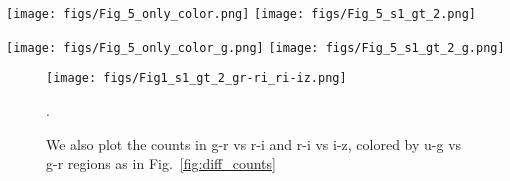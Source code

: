 \documentclass[fleqn,usenatbib]{mnras}  %
\begin{document}
\begin{figure*}
\texttt{[image: figs/Fig\_5\_only\_color.png]}
\texttt{[image: figs/Fig\_5\_s1\_gt\_2.png]}
\caption{Two four-panel figures side by side for the ease of comparison.  Both contain counts in the u vs u-g and  u-g vs g-r,  colored by regions marked on the panel, and differential counts in u and r (see Fig.1 of Ivezic+2004).  The counts contain only objects as selected by u-g vs g-r color cuts, to colors on the differential counts panels corresponds to the colors on u-g vs g-r space. Red objects are mostly quasars, blue: hot stars (one can easily pick out two white dwarf branches, see  Fig.23 and 24 in Ivezic+2007), green : transitional region, black : main sequence stars .  Left set of four panels   : only color-selected object . Right  set : variability and color-selected objects. Note that including $\chi^{2}_{DOF,R}(g) > 2$ cut we vastly reduce contamination due to main sequence stars, and hot white  dwarfs.  }
\label{fig:diff_counts}
\end{figure*}

\begin{figure*}
\texttt{[image: figs/Fig\_5\_only\_color\_g.png]}
\texttt{[image: figs/Fig\_5\_s1\_gt\_2\_g.png]}
\caption{As Fig.~\ref{fig:diff_counts}, but showing counts in g band. Left : only color selection, right : color and variability selection. }
\label{fig:diff_counts_g}
\end{figure*}


\begin{figure}\texttt{[image: figs/Fig1\_s1\_gt\_2\_gr-ri\_ri-iz.png]}
\caption{We also plot the counts in  g-r vs r-i and r-i vs i-z,  colored by u-g vs g-r regions as in Fig.~\ref{fig:diff_counts}}. 
\label{fig:diff_counts_ri}
\end{figure}





%
\end{document}
